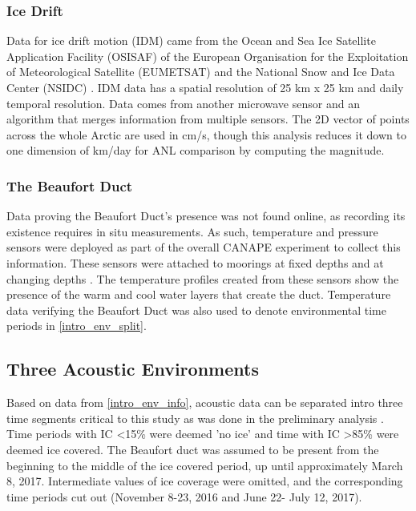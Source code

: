 \subsubsection{Ice Drift} \label{intro_env_ice_dri}

Data for ice drift motion (IDM) came from the Ocean and Sea Ice Satellite Application Facility (OSISAF) \parencite{osisaf_data} of the European Organisation for the Exploitation of Meteorological Satellite (EUMETSAT) \parencite{osisaf_man} and the National Snow and Ice Data Center (NSIDC) \parencite{Tschudi2019polar}. IDM data has a spatial resolution of 25 km x 25 km and daily temporal resolution. Data comes from another microwave sensor and an algorithm that merges information from multiple sensors. The 2D vector of points across the whole Arctic are used in cm/s, though this analysis reduces it down to one dimension of km/day for ANL comparison by computing the magnitude.


\subsubsection{The Beaufort Duct} \label{intro_env_duct}
Data proving the Beaufort Duct's presence was not found online, as recording its existence requires in situ measurements. As such, temperature and pressure sensors were deployed as part of the overall CANAPE experiment to collect this information. These sensors were attached to moorings at fixed depths and at changing depths \parencite{ballard2020temporal}. The temperature profiles created from these sensors show the presence of the warm and cool water layers that create the duct. Temperature data verifying the Beaufort Duct was also used to denote environmental time periods in \autoref{intro_env_split}.

\subsection{Three Acoustic Environments} \label{intro_env_split}

Based on data from \autoref{intro_env_info}, acoustic data can be separated intro three time segments critical to this study as was done in the preliminary analysis \parencite{Bonnel2021}. Time periods with IC <15\% were deemed 'no ice' and time with IC >85\% were deemed ice covered. The Beaufort duct was assumed to be present from the beginning to the middle of the ice covered period, up until approximately March 8, 2017. \parencite{ballard2020temporal} Intermediate values of ice coverage were omitted, and the corresponding time periods cut out (November 8-23, 2016 and June 22- July 12, 2017).

